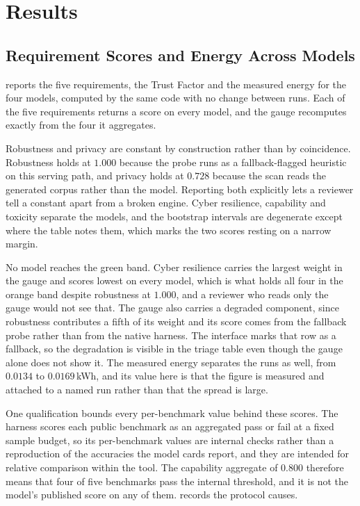 \documentclass[10pt,conference]{IEEEtran}
\begin{document}
\section{Results}
\label{sec:results}

\subsection{Requirement Scores and Energy Across Models}
\label{sec:panelresults}
 reports the five requirements, the Trust Factor and the measured energy for the four models, computed by the same code with no change between runs.
Each of the five requirements returns a score on every model, and the gauge recomputes exactly from the four it aggregates.

Robustness and privacy are constant by construction rather than by coincidence.
Robustness holds at $1.000$ because the probe runs as a fallback-flagged heuristic on this serving path, and privacy holds at $0.728$ because the scan reads the generated corpus rather than the model.
Reporting both explicitly lets a reviewer tell a constant apart from a broken engine.
Cyber resilience, capability and toxicity separate the models, and the bootstrap intervals are degenerate except where the table notes them, which marks the two scores resting on a narrow margin.

No model reaches the green band.
Cyber resilience carries the largest weight in the gauge and scores lowest on every model, which is what holds all four in the orange band despite robustness at $1.000$, and a reviewer who reads only the gauge would not see that.
The gauge also carries a degraded component, since robustness contributes a fifth of its weight and its score comes from the fallback probe rather than from the native harness.
The interface marks that row as a fallback, so the degradation is visible in the triage table even though the gauge alone does not show it.
The measured energy separates the runs as well, from $0.0134$ to $0.0169$\,kWh, and its value here is that the figure is measured and attached to a named run rather than that the spread is large.

One qualification bounds every per-benchmark value behind these scores.
The harness scores each public benchmark as an aggregated pass or fail at a fixed sample budget, so its per-benchmark values are internal checks rather than a reproduction of the accuracies the model cards report, and they are intended for relative comparison within the tool.
The capability aggregate of $0.800$ therefore means that four of five benchmarks pass the internal threshold, and it is not the model's published score on any of them.
 records the protocol causes.
\end{document}
